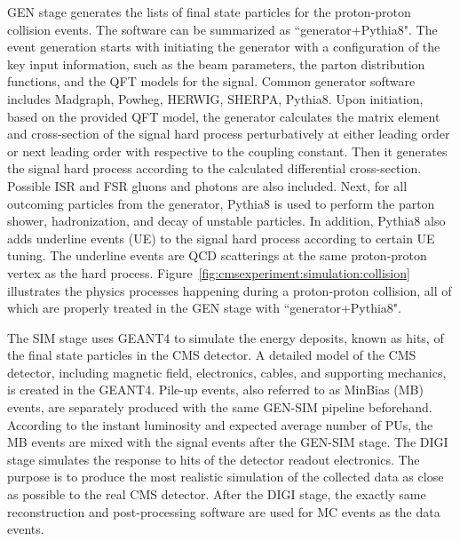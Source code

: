 GEN stage generates the lists of final state particles for the proton-proton collision events. The software can be summarized as ``generator+Pythia8". The event generation starts with initiating the generator with a configuration of the key input information, such as the beam parameters, the parton distribution functions, and the QFT models for the signal. Common generator software includes Madgraph, Powheg, HERWIG, SHERPA, Pythia8. Upon initiation, based on the provided QFT model, the generator calculates the matrix element and cross-section of the signal hard process perturbatively at either leading order or next leading order with respective to the coupling constant. Then it generates the signal hard process according to the calculated differential cross-section. Possible ISR and FSR gluons and photons are also included. Next, for all outcoming particles from the generator, Pythia8 is used to perform the parton shower, hadronization, and decay of unstable particles. In addition, Pythia8 also adds underline events (UE) to the signal hard process according to certain UE tuning. The underline events are QCD scatterings at the same proton-proton vertex as the hard process. Figure~\ref{fig:cmsexperiment:simulation:collision} illustrates the physics processes happening during a proton-proton collision, all of which are properly treated in the GEN stage with ``generator+Pythia8".




The SIM stage uses GEANT4 to simulate the energy deposits, known as hits, of the final state particles in the CMS detector. A detailed model of the CMS detector, including magnetic field, electronics, cables, and supporting mechanics, is created in the GEANT4.  Pile-up events, also referred to as MinBias (MB) events, are separately produced with the same GEN-SIM pipeline beforehand. According to the instant luminosity and expected average number of PUs, the MB events are mixed with the signal events after the GEN-SIM stage. The DIGI stage simulates the response to hits of the detector readout electronics. The purpose is to produce the most realistic simulation of the collected data as close as possible to the real CMS detector. After the DIGI stage, the exactly same reconstruction and post-processing software are used for MC events as the data events. 